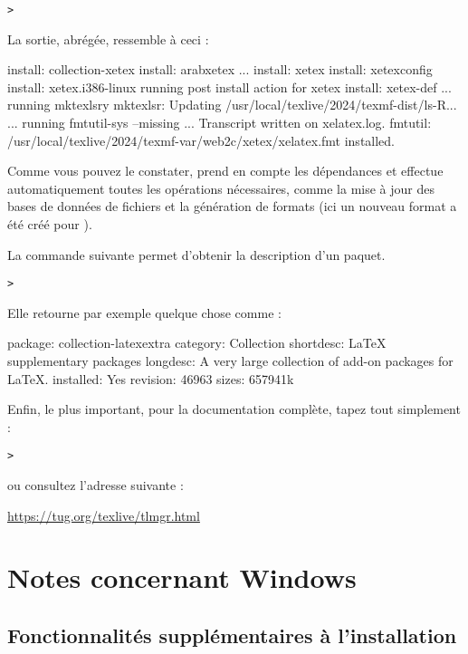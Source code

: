 \documentclass[german, english, french, 12pt]{article}
\begin{document}
\begin{alltt}
> 
\end{alltt}
La sortie, abrégée, ressemble à ceci :
\begin{fverbatim}
install: collection-xetex
install: arabxetex
...
install: xetex
install: xetexconfig
install: xetex.i386-linux
running post install action for xetex
install: xetex-def
...
running mktexlsry
mktexlsr: Updating /usr/local/texlive/2024/texmf-dist/ls-R...
...
running fmtutil-sys --missing
...
Transcript written on xelatex.log.
fmtutil: /usr/local/texlive/2024/texmf-var/web2c/xetex/xelatex.fmt installed.
\end{fverbatim}
Comme vous pouvez le constater,  prend en compte les dépendances et
effectue automatiquement toutes les opérations nécessaires, comme la mise à jour
des bases de données de fichiers et la génération de formats (ici un nouveau
format a été créé pour \XeTeX).

La commande suivante permet d'obtenir la description d'un paquet.
\begin{alltt}
> 
\end{alltt}
Elle retourne par exemple quelque chose comme :
\begin{fverbatim}
package:    collection-latexextra
category:   Collection
shortdesc:  LaTeX supplementary packages
longdesc:   A very large collection of add-on packages for LaTeX.
installed:  Yes
revision:   46963
sizes:	    657941k
\end{fverbatim}

Enfin, le plus important, pour la documentation complète, tapez tout
simplement :
\begin{alltt}
> 
\end{alltt}
ou consultez l'adresse suivante :

\url{https://tug.org/texlive/tlmgr.html}

\section{Notes concernant Windows}
\label{sec:windows}

\subsection{Fonctionnalités supplémentaires à l'installation}
\label{sec:winfeatures}
\end{document}
